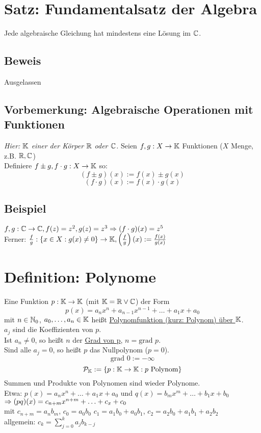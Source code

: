 \section{Satz: Fundamentalsatz der Algebra}\label{6.8}
Jede algebraische Gleichung hat mindestens eine Lösung im $\mathbb{C}$.

\subsection*{Beweis}
Ausgelassen

\subsection*{Vorbemerkung: Algebraische Operationen mit Funktionen}
\emph{Hier: $\mathbb{K}$ einer der Körper $\mathbb{R}$ oder $\mathbb{C}$.}\nl
Seien $f,g: X \to \mathbb{K}$ Funktionen ($X$ Menge, z.B. $\mathbb{R}, \mathbb{C}$)\\
Definiere $f \pm g, f \cdot g: X \to \mathbb{K}$ so:
$$(f \pm g)(x) := f(x) \pm g(x)$$
$$(f \cdot g)(x) := f(x) \cdot g(x)$$

\subsection*{Beispiel}
$f,g: \mathbb{C} \to \mathbb{C}, f(z) = z^2, g(z)=z^3 \Rightarrow (f \cdot g)(x)=z^5$\\
Ferner: $\frac{f}{g}: \{x \in X: g(x) \neq 0\} \to \mathbb{K}, \left( \frac{f}{g} \right)(x) := \frac{f(x)}{g(x)}$

\section{Definition: Polynome}\label{6.9}
Eine Funktion $p: \mathbb{K} \to \mathbb{K}$ (mit $\mathbb{K} = \mathbb{R} \vee \mathbb{C}$) der Form
$$p(x) = a_n x^n + a_{n-1} x^{n-1} + \ldots + a_1 x + a_0$$
mit $n \in \mathbb{N}_0$, $a_0,\ldots,a_n \in \mathbb{K}$ heißt \underline{Polynomfunktion (kurz: Polynom) über $\mathbb{K}$}.\\
$a_j$ sind die Koeffizienten von $p$.\\
Ist $a_n \neq 0$, so heißt $n$ der \underline{Grad von p}, $n=\text{grad }p$.\\
Sind alle $a_j = 0$, so heißt $p$ das Nullpolynom ($p=0$).
$$\text{grad }0 := -\infty$$
$$\mathcal{P}_{\mathbb{K}} := \{p: \mathbb{K} \to \mathbb{K}: p \text{ Polynom}\}$$
Summen und Produkte von Polynomen sind wieder Polynome.\\
Etwa: $p(x) = a_n x^n + \ldots + a_1 x + a_0$ und $q(x) = b_m x^m + \ldots + b_1 x + b_0$\\
$\Rightarrow (pq)(x) = c_{n+m} x^{n+m} + \ldots + c_ x + c_0$\\
mit $c_{n+m} = a_n b_m$, $c_0 = a_0 b_0$ $c_1 = a_1 b_0 + a_0 b_1$, $c_2 = a_2 b_0 + a_1 b_1 + a_2 b_2$\\
allgemein: $c_k = \sum_{j=0}^k a_j b_{k-j}$

